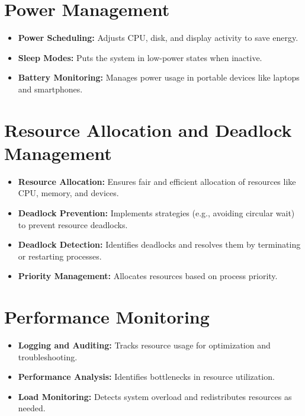 \documentclass[openany]{book} %
\begin{document}
\section{Power Management}
\begin{itemize}
    \item \textbf{Power Scheduling:} Adjusts CPU, disk, and display activity to save energy.
    \item \textbf{Sleep Modes:} Puts the system in low-power states when inactive.
    \item \textbf{Battery Monitoring:} Manages power usage in portable devices like laptops and smartphones.
\end{itemize}

\section{Resource Allocation and Deadlock Management}
\begin{itemize}
    \item \textbf{Resource Allocation:} Ensures fair and efficient allocation of resources like CPU, memory, and devices.
    \item \textbf{Deadlock Prevention:} Implements strategies (e.g., avoiding circular wait) to prevent resource deadlocks.
    \item \textbf{Deadlock Detection:} Identifies deadlocks and resolves them by terminating or restarting processes.
    \item \textbf{Priority Management:} Allocates resources based on process priority.
\end{itemize}

\section{Performance Monitoring}
\begin{itemize}
    \item \textbf{Logging and Auditing:} Tracks resource usage for optimization and troubleshooting.
    \item \textbf{Performance Analysis:} Identifies bottlenecks in resource utilization.
    \item \textbf{Load Monitoring:} Detects system overload and redistributes resources as needed.
\end{itemize}

\end{document}
